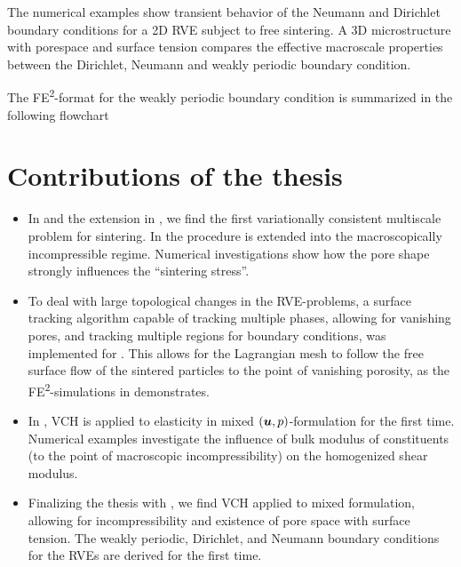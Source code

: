 \documentclass[MikaelDissertation.tex]{subfiles}
\begin{document}
\begin{itemize}
The numerical examples show transient behavior of the Neumann and Dirichlet boundary conditions for a 2D RVE subject to free sintering.
A 3D microstructure with porespace and surface tension compares the effective macroscale properties between the Dirichlet, Neumann and weakly periodic boundary condition.

The FE\textsuperscript{2}-format for the weakly periodic boundary condition is summarized in the following flowchart
\begin{center}
  
\end{center}

\end{itemize}


\chapter{Contributions of the thesis}
\begin{itemize}
 \item In  and the extension in , we find the first variationally consistent multiscale problem for sintering.
   In  the procedure is extended into the macroscopically incompressible regime. Numerical investigations show how the pore shape strongly influences the ``sintering stress''.
 \item To deal with large topological changes in the RVE-problems, a surface tracking algorithm capable of tracking multiple phases, allowing for vanishing pores, and tracking multiple regions for boundary conditions, was implemented for . 
   This allows for the Lagrangian mesh to follow the free surface flow of the sintered particles to the point of vanishing porosity, as the FE\textsuperscript{2}-simulations in  demonstrates.
 \item In , VCH is applied to elasticity in mixed $(\boldsymbol{u},p)$-formulation for the first time.
  Numerical examples investigate the influence of bulk modulus of constituents (to the point of macroscopic incompressibility) on the homogenized shear modulus.
 \item Finalizing the thesis with , we find VCH applied to mixed formulation, allowing for incompressibility and existence of pore space with surface tension.
   The weakly periodic, Dirichlet, and Neumann boundary conditions for the RVEs are derived for the first time.
\end{itemize}
\end{document}
